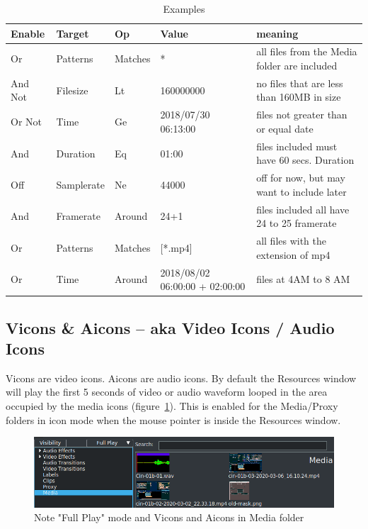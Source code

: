 \begin{table}[htpb]
    \centering
    \caption{Examples}
    \label{tab:label}
    \small
    \begin{tabular}{llllm{10em}} \toprule
        Enable&	Target&	Op&	Value&	meaning\\\midrule
Or	&Patterns  &Matches   &*&	 all files from the Media folder are included\\
And Not&Filesize&Lt	&160000000& no files that are less than 160MB in size \\
Or Not&	Time	&Ge	&2018/07/30 06:13:00	& files not greater than or equal date\\
And	&Duration&Eq	&01:00		& files included must have 60 secs. Duration\\
Off	&Samplerate&Ne	&44000		& off for now, but may want to include later\\
And	&Framerate&Around&24+1		& files included all have 24 to 25 framerate\\
Or	&Patterns&Matches&[*.mp4]	& all files with the extension of mp4\\
Or	&Time&	Around&2018/08/02 06:00:00 + 02:00:00  & files at 4AM to 8 AM\\\bottomrule
    \end{tabular}
\end{table}


\subsection{Vicons \& Aicons – aka Video Icons / Audio Icons}%
\label{sub:vicons_aicons_aka_video_icons_audio_icons}

Vicons are video icons.  
Aicons are audio icons.  
By default the Resources window will play the first 5 seconds of video or audio waveform looped in the area occupied by the media icons (figure~\ref{fig:vicons1}). 
This is enabled for the Media/Proxy folders in icon mode when the mouse pointer is inside the Resources window. 

\begin{figure}[htpb]
    \centering
    \includegraphics[width=0.99\linewidth]{images/vicons1.png}
    \caption{Note "Full Play" mode and Vicons and Aicons in Media folder}
    \label{fig:vicons1}
\end{figure}

